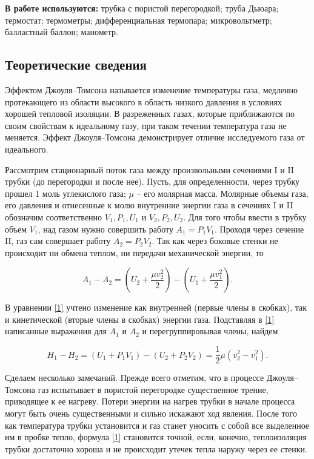 \documentclass[12pt,a4paper]{article}
\begin{document}
\textbf{В работе используются:} трубка с пористой перегородкой; труба Дьюара; термостат; термометры; дифференциальная термопара; микровольтметр; балластный баллон; манометр.
\subsection{Теоретические сведения}

Эффектом Джоуля–Томсона называется изменение температуры газа, медленно протекающего из области высокого в область низкого давления в условиях хорошей тепловой изоляции. В разреженных газах, которые приближаются по своим свойствам к идеальному газу, при таком течении температура газа не меняется. Эффект Джоуля–Томсона демонстрирует отличие исследуемого газа от идеального.

Рассмотрим стационарный поток газа между произвольными сечениями I и II трубки (до перегородки и после нее). Пусть, для определенности, через трубку прошел 1 моль углекислого газа; $ \mu $ -- его молярная масса. Молярные объемы газа, его давления и отнесенные к молю внутренние энергии газа в сечениях I и II обозначим соответственно $ V_1, P_1, U_1 $ и $ V_2, P_2, U_2 $. Для того чтобы ввести в трубку объем $ V_1 $, над газом нужно совершить работу $ A_1 = P_1V_1 $. Проходя через сечение II, газ сам совершает работу $ A_2 = P_2V_2 $. Так как через боковые стенки не происходит ни обмена теплом, ни передачи механической энергии, то

\begin{equation}\label{1}
A_1-A_2=\left(U_2+\frac{\mu v_2^2}{2}\right) - \left(U_1 + \frac{\mu v_1^2}{2}\right).
\end{equation}

В уравнении \eqref{1} учтено изменение как внутренней (первые члены в скобках), так и кинетической (вторые члены в скобках) энергии газа. Подставляя в \eqref{1} написанные выражения для $ A_1 $ и $ A_2 $ и перегруппировывая члены, найдем

\begin{equation}\label{2}
H_1-H_2=\left(U_1+P_1V_1\right) - \left(U_2 + P_2V_2\right) = \frac{1}{2} \mu \left(v^2_2-v^2_1\right).
\end{equation}

Сделаем несколько замечаний. Прежде всего отметим, что в процессе Джоуля–Томсона газ испытывает в пористой перегородке существенное трение, приводящее к ее нагреву. Потери энергии на нагрев трубки в начале процесса могут быть очень существенными и сильно искажают ход явления. После того как температура трубки установится и газ станет уносить с собой все выделенное им в пробке тепло, формула \eqref{1} становится точной, если, конечно, теплоизоляция трубки достаточно хороша и не происходит утечек тепла наружу через ее стенки.
\end{document}
